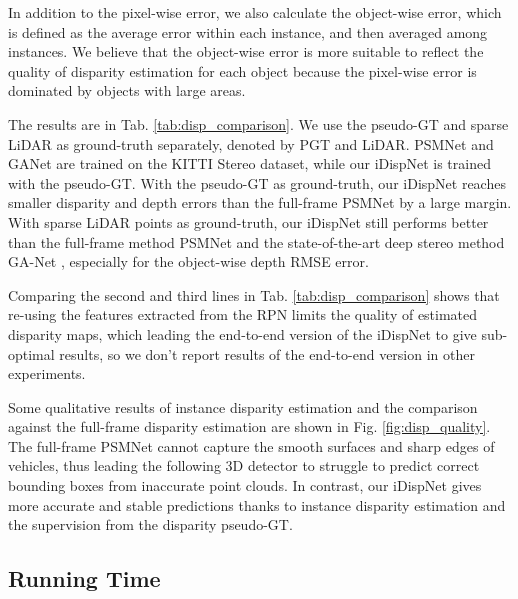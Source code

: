 \documentclass[10pt,twocolumn,letterpaper]{article}
\begin{document}
In addition to the pixel-wise error, we also calculate the object-wise error, which is defined as the average error within each instance, and then averaged among instances.
We believe that the object-wise error is more suitable to reflect the quality of disparity estimation for each object because the pixel-wise error is dominated by objects with large areas.

The results are in Tab. \ref{tab:disp_comparison}. We use the pseudo-GT and sparse LiDAR as ground-truth separately, denoted by PGT and LiDAR.
PSMNet and GANet are trained on the KITTI Stereo dataset, while our iDispNet is trained with the pseudo-GT.
With the pseudo-GT as ground-truth, our iDispNet reaches smaller disparity and depth errors than the full-frame PSMNet by a large margin.
With sparse LiDAR points as ground-truth, our iDispNet still performs better than the full-frame method PSMNet and the state-of-the-art deep stereo method GA-Net \cite{zhang2019ga}, especially for the object-wise depth RMSE error.

Comparing the second and third lines in Tab. \ref{tab:disp_comparison} shows that re-using the features extracted from the RPN limits the quality of estimated disparity maps, which leading the end-to-end version of the iDispNet to give sub-optimal results, so we don't report results of the end-to-end version in other experiments.

Some qualitative results of instance disparity estimation and the comparison against the full-frame disparity estimation are shown in Fig. \ref{fig:disp_quality}.
The full-frame PSMNet cannot capture the smooth surfaces and sharp edges of vehicles, thus leading the following 3D detector to struggle to predict correct bounding boxes from inaccurate point clouds.
In contrast, our iDispNet gives more accurate and stable predictions thanks to instance disparity estimation and the supervision from the disparity pseudo-GT.
\subsection{Running Time}\label{sec:exp-running-time}
\begin{table}
\setlength{\belowcaptionskip}{-0.3cm}
\begin{center}
\renewcommand{\arraystretch}{1.3}
\end{center}
\vspace{-0.3 mm}
\caption{\textbf{Running time comparison.} S-RCNN represents Stereo R-CNN \cite{li2019stereo}.}
\label{tab:run-time}
\end{table}
\end{document}
